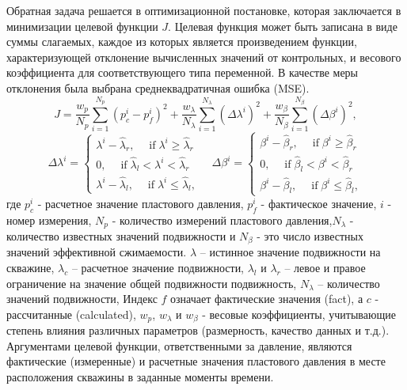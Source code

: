 \documentclass{article}
\begin{document}
Обратная задача решается в оптимизационной постановке, которая заключается в минимизации целевой функции $J$.
Целевая функция может быть записана в виде суммы слагаемых, каждое из которых является произведением функции, характеризующей отклонение
вычисленных значений от контрольных, и весового коэффициента для соответствующего типа переменной. В качестве меры отклонения была выбрана среднеквадратичная ошибка (MSE).
\begin{equation} \label{mse}
	J=\frac{w_p}{N_p}\sum_{i=1}^{N_p}{\left(p_c^i-p_f^i\right)^2}+
	\frac{w_{\lambda}}{N_\lambda}\sum_{i=1}^{N_\lambda}{\left(\Delta\lambda^i  \right)^2}+
	\frac{w_{\beta}}{N_\beta}\sum_{i=1}^{N_\beta}{\left(\Delta\beta^i  \right)^2},
\end{equation}
\begin{equation}
		\Delta\lambda^i  = \left\{\begin{array}{crl}
		\lambda^i - \hat{\lambda}_r, \quad \;\mbox{if}\; \lambda^i \ge \hat{\lambda}_r\\
		0,\quad \;\mbox{if}\; \hat{\lambda}_l < \lambda^i < \hat{\lambda}_r\\
		\lambda^i - \hat{\lambda}_l, \quad \;\mbox{if}\;\lambda^i \le \hat{\lambda}_l,
	\end{array}\right.
		\quad
		\Delta\beta^i  = \left\{\begin{array}{crl}
		\beta^i - \hat{\beta}_r, \quad \;\mbox{if}\; \beta^i \ge \hat{\beta}_r\\
		0,\quad \;\mbox{if}\; \hat{\beta}_l < \beta^i < \hat{\beta}_r\\
		\beta^i - \hat{\beta}_l, \quad \;\mbox{if}\;\beta^i \le \hat{\beta}_l,
	\end{array}\right.
\end{equation}	
где $p_c^i$ - расчетное значение пластового давления, $p_f^i$
- фактическое значение, $i$ - номер измерения, $N_p$ -
количество измерений пластового давления,$N_\lambda$ -
количество известных значений подвижности и $N_\beta$ - это число известных значений эффективной сжимаемости. $\lambda$ – истинное значение подвижности на скважине, $\lambda_c$ – расчетное значение подвижности,  $\lambda_l$ и $\lambda_r$ – левое и правое ограничение на значение общей подвижности подвижность,  $N_\lambda$ – количество значений подвижности,
Индекс $f$ означает фактические значения (fact), а $c$ - рассчитанные (calculated), $w_p$, $w_\lambda$ и $w_\beta$ - весовые коэффициенты, учитывающие степень влияния различных параметров (размерность, качество данных и т.д.). Аргументами целевой функции, ответственными за давление, являются фактические (измеренные) и расчетные значения пластового давления в месте расположения скважины в заданные моменты времени.
\end{document}

